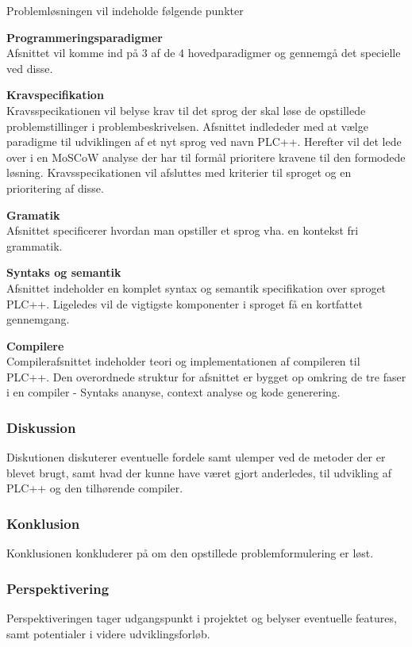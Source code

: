 Problemløsningen vil indeholde følgende punkter
\begin{itemize_small}
    \item \textbf{Programmeringsparadigmer}\\
    Afsnittet vil komme ind på 3 af de 4 hovedparadigmer og gennemgå det specielle ved disse.
    \item \textbf{Kravspecifikation}\\
    Kravsspecikationen vil belyse krav til det sprog der skal løse de opstillede problemstillinger i problembeskrivelsen. Afsnittet indlededer med at vælge paradigme til udviklingen af et nyt sprog ved navn PLC++. Herefter vil det lede over i en MoSCoW analyse der har til formål prioritere kravene til den formodede løsning. Kravsspecikationen vil afsluttes med kriterier til sproget og en prioritering af disse.
    \item \textbf{Gramatik}\\ Afsnittet specificerer hvordan man opstiller et sprog vha. en kontekst fri grammatik.
    \item \textbf{Syntaks og semantik}\\
    Afsnittet indeholder en komplet syntax og semantik specifikation over sproget PLC++. Ligeledes vil de vigtigste komponenter i sproget få en kortfattet gennemgang.
    \item \textbf{Compilere}\\
    Compilerafsnittet indeholder teori og implementationen af compileren til PLC++. Den overordnede struktur for afsnittet er bygget op omkring de tre faser i en compiler - Syntaks ananyse, context analyse og kode generering.
\end{itemize_small}

\subsubsection*{Diskussion}
Diskutionen diskuterer eventuelle fordele samt ulemper ved de metoder der er blevet brugt, samt hvad der kunne have været gjort anderledes, til udvikling af PLC++ og den tilhørende compiler. 
\subsubsection*{Konklusion}
Konklusionen konkluderer på om den opstillede problemformulering er løst.

\subsubsection*{Perspektivering}
Perspektiveringen tager udgangspunkt i projektet og belyser eventuelle features, samt potentialer i videre udviklingsforløb.

